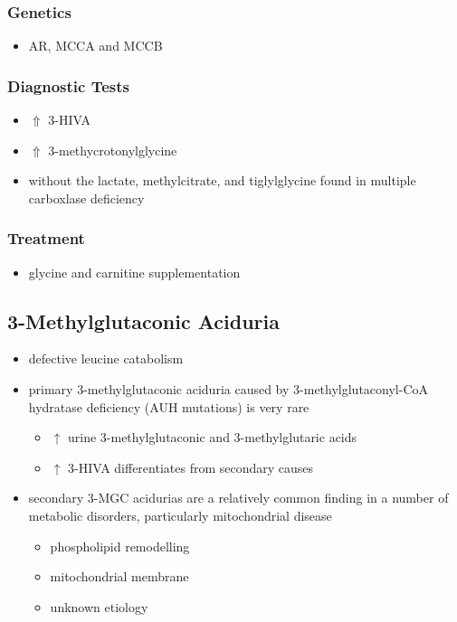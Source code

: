 \documentclass{scrartcl}
\begin{document}
\subsubsection{Genetics}
\label{sec:orgb5068c4}
\begin{itemize}
\item AR, MCCA and MCCB
\end{itemize}
\subsubsection{Diagnostic Tests}
\label{sec:orged9f974}
\begin{itemize}
\item \(\Uparrow\) 3-HIVA
\item \(\Uparrow\) 3-methycrotonylglycine
\item without the lactate, methylcitrate, and tiglylglycine found in
multiple carboxlase deficiency
\end{itemize}

\subsubsection{Treatment}
\label{sec:org253fe21}
\begin{itemize}
\item glycine and carnitine supplementation
\end{itemize}

\subsection{3-Methylglutaconic Aciduria}
\label{sec:org2746465}
\begin{itemize}
\item defective leucine catabolism
\item primary 3-methylglutaconic aciduria caused by 3-methylglutaconyl-CoA
hydratase deficiency (AUH mutations) is very rare
\begin{itemize}
\item \(\uparrow\) urine 3-methylglutaconic and 3-methylglutaric acids
\item \(\uparrow\) 3-HIVA differentiates from secondary causes
\end{itemize}
\item secondary 3-MGC acidurias are a relatively common finding in a
number of metabolic disorders, particularly mitochondrial disease
\begin{itemize}
\item phospholipid remodelling
\item mitochondrial membrane
\item unknown etiology
\end{itemize}
\end{itemize}
\end{document}
